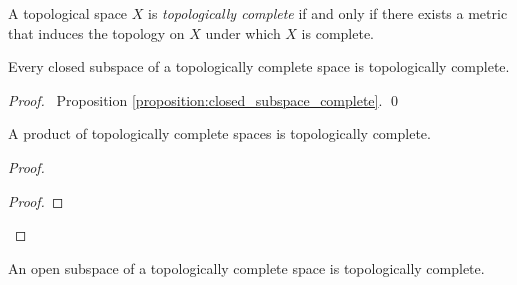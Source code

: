 \begin{definition}
    A topological space $X$ is \emph{topologically complete} if and only if there exists a metric that induces the topology on $X$
    under which $X$ is complete.
\end{definition}

\begin{proposition}
    \label{proposition:closed_subspace_topolgically_complete}
    Every closed subspace of a topologically complete space is topologically complete.
\end{proposition}

\begin{proof}
    \pf\ Proposition \ref{proposition:closed_subspace_complete}. \qed
\end{proof}

\begin{proposition}[Choice]
    \label{proposition:product_topologically_complete}
    A product of topologically complete spaces is topologically complete.
\end{proposition}

\begin{proof}
    \pf
    \begin{proof}
    \end{proof}
\end{proof}

\begin{proposition}
    \label{proposition:open_subspace_topologically_complete}
    An open subspace of a topologically complete space is topologically complete.
\end{proposition}

